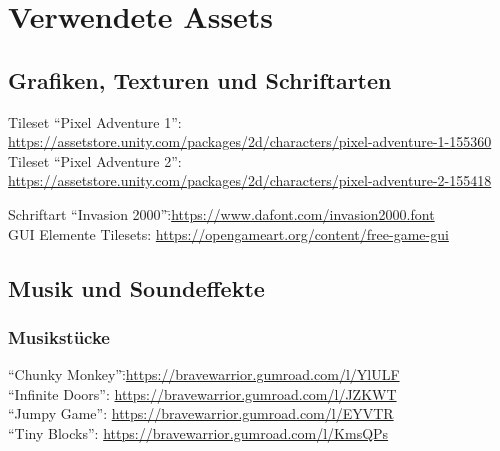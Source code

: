 \setlength{\parindent}{0em}

\chapter{Verwendete Assets}

\label{Chapter4}


\section{Grafiken, Texturen und Schriftarten}

Tileset \enquote{Pixel Adventure 1}:\\ \url{https://assetstore.unity.com/packages/2d/characters/pixel-adventure-1-155360}\\
Tileset \enquote{Pixel Adventure 2}:\\ \url{https://assetstore.unity.com/packages/2d/characters/pixel-adventure-2-155418}

\begin{tabbing}
Schriftart \enquote{Invasion 2000}:\= \quad \url{https://www.dafont.com/invasion2000.font}\\
GUI Elemente Tilesets:\> \quad \url{https://opengameart.org/content/free-game-gui}
\end{tabbing}


\section{Musik und Soundeffekte}

\subsection{Musikstücke}

\begin{tabbing}
\enquote{Chunky Monkey}:\= \quad \url{https://bravewarrior.gumroad.com/l/YlULF}\\
\enquote{Infinite Doors}:\> \quad \url{https://bravewarrior.gumroad.com/l/JZKWT}\\
\enquote{Jumpy Game}:\> \quad \url{https://bravewarrior.gumroad.com/l/EYVTR}\\
\enquote{Tiny Blocks}:\> \quad \url{https://bravewarrior.gumroad.com/l/KmsQPs}
\end{tabbing}

